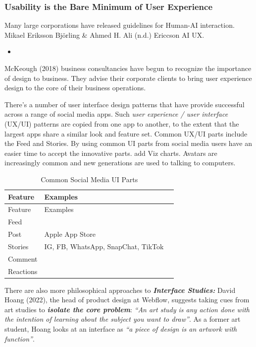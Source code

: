 \documentclass[
  letterpaper,
  DIV=11,
  numbers=noendperiod]{scrartcl}
\providecommand{\tightlist}{%
  \setlength{\itemsep}{0pt}\setlength{\parskip}{0pt}}\usepackage{longtable,booktabs,array}
\begin{document}
\subsubsection{Usability is the Bare Minimum of User
Experience}\label{usability-is-the-bare-minimum-of-user-experience}

Many large corporations have released guidelines for Human-AI
interaction. Mikael Eriksson Björling \& Ahmed H. Ali (n.d.) Ericcson AI
UX.

\begin{itemize}
\tightlist
\item
\end{itemize}

McKeough (2018) business consultancies have begun to recognize the
importance of design to business. They advise their corporate clients to
bring user experience design to the core of their business operations.

There's a number of user interface design patterns that have provide
successful across a range of social media apps. Such \emph{user
experience / user interface} (UX/UI) patterns are copied from one app to
another, to the extent that the largest apps share a similar look and
feature set. Common UX/UI parts include the Feed and Stories. By using
common UI parts from social media users have an easier time to accept
the innovative parts. add Viz charts. Avatars are increasingly common
and new generations are used to talking to computers.

\begin{longtable}[]{@{}lll@{}}
\caption{Common Social Media UI Parts}\tabularnewline
\toprule\noalign{}
Feature & Examples & \\
\midrule\noalign{}
\endfirsthead
\toprule\noalign{}
Feature & Examples & \\
\midrule\noalign{}
\endhead
\bottomrule\noalign{}
\endlastfoot
Feed & & \\
Post & Apple App Store & \\
Stories & IG, FB, WhatsApp, SnapChat, TikTok & \\
Comment & & \\
Reactions & & \\
\end{longtable}

There are also more philosophical approaches to \textbf{\emph{Interface
Studies:}} David Hoang (2022), the head of product design at Webflow,
suggests taking cues from art studies to \textbf{\emph{isolate the core
problem}}: \emph{``An art study is any action done with the intention of
learning about the subject you want to draw''}. As a former art student,
Hoang looks at an interface as \emph{``a piece of design is an artwork
with function''}.
\end{document}
